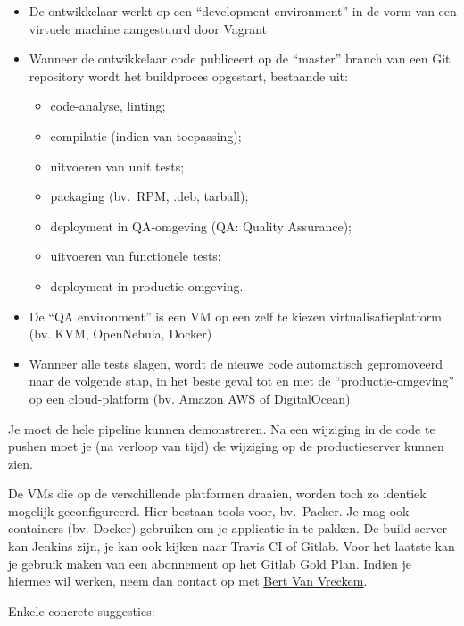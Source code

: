 \begin{itemize}
\item De ontwikkelaar werkt op een ``development environment'' in de vorm van een virtuele machine aangestuurd door Vagrant
\item Wanneer de ontwikkelaar code publiceert op de ``master'' branch van een Git repository wordt het buildproces opgestart, bestaande uit:

  \begin{itemize}
  \item code-analyse, linting;
  \item compilatie (indien van toepassing);
  \item uitvoeren van unit tests;
  \item packaging (bv.~RPM, .deb, tarball);
  \item deployment in QA-omgeving (QA: Quality Assurance);
  \item uitvoeren van functionele tests;
  \item deployment in productie-omgeving.
  \end{itemize}

\item De ``QA environment'' is een VM op een zelf te kiezen virtualisatieplatform (bv. KVM, OpenNebula, Docker)
\item Wanneer alle tests slagen, wordt de nieuwe code automatisch gepromoveerd naar de volgende stap, in het beste geval tot en met de ``productie-omgeving'' op een cloud-platform (bv. Amazon AWS of DigitalOcean).
\end{itemize}

Je moet de hele pipeline kunnen demonstreren. Na een wijziging in de code te pushen moet je (na verloop van tijd) de wijziging op de productieserver kunnen zien.

De VMs die op de verschillende platformen draaien, worden toch zo identiek mogelijk geconfigureerd. Hier bestaan tools voor, bv.~Packer.  Je mag ook containers (bv. Docker) gebruiken om je applicatie in te pakken. De build server kan Jenkins zijn, je kan ook kijken naar Travis CI of Gitlab. Voor het laatste kan je gebruik maken van een abonnement op het Gitlab Gold Plan. Indien je hiermee wil werken, neem dan contact op met \href{mailto:bert.vanvreckem@hogent.be}{Bert Van Vreckem}.

Enkele concrete suggesties:

